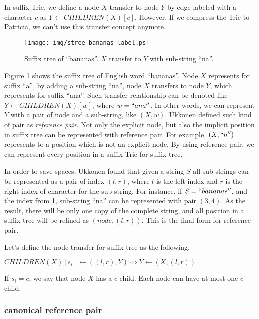 \documentclass{article}
\begin{document}
In suffix Trie, we define a node $X$ transfer to node $Y$ by edge labeled with
a character $c$ as $Y \leftarrow CHILDREN(X)[c]$, However, If we compress the Trie
to Patricia, we can't use this transfer concept anymore.

\begin{figure}[htbp]
   \begin{center}
     \texttt{[image: img/stree-bananas-label.ps]}
     \caption{Suffix tree of ``bananas''. $X$ transfer to $Y$ with sub-string ``na''.}
     \label{fig:stree-bananas-label}
   \end{center}
\end{figure}

Figure \ref{fig:stree-bananas-label} shows the suffix tree of English word ``bananas''.
Node $X$ represents for suffix ``a'', by adding a sub-string ``na'', node $X$ transfers
to node $Y$, which represents for suffix ``ana''. Such transfer relationship can be
denoted like $Y \leftarrow CHILDREN(X)[w]$, where $w=``ana''$. In other words, we can
represent $Y$ with a pair of node and a sub-string, like $(X, w)$. Ukkonen defined
such kind of pair as {\em reference pair}. Not only the explicit node, but also the
implicit position in suffix tree can be represented with reference pair. For example,
$(X, ``n'')$ represents to a position which is not an explicit node. By using reference
pair, we can represent every position in a suffix Trie for suffix tree.

In order to save spaces, Ukkonen found that given a string $S$ all sub-strings can
be represented as a pair of index $(l, r)$, where $l$ is the left index and $r$ is the 
right index of character for the sub-string. For instance, if $S=``bananas''$, and the
index from 1, sub-string ``na'' can be represented with pair $(3, 4)$. As the result,
there will be only one copy of the complete string, and all position in a suffix tree
will be refined as $(node, (l, r))$. This is the final form for reference pair.

Let's define the node transfer for suffix tree as the following.

$CHILDREN(X)[s_l] \leftarrow ((l, r), Y) \iff Y \leftarrow (X, (l, r))$

If $s_i=c$, we say that node $X$ has a $c$-child. Each node can have at most one $c$-child.

\subsubsection{canonical reference pair}
\end{document}
